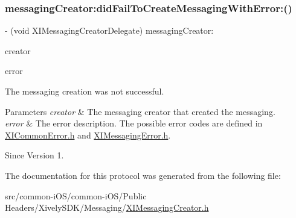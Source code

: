 \subsubsection{\texorpdfstring{messaging\+Creator\+:did\+Fail\+To\+Create\+Messaging\+With\+Error\+:()}{messagingCreator:didFailToCreateMessagingWithError:()}}
{\footnotesize\ttfamily -\/ (void X\+I\+Messaging\+Creator\+Delegate) messaging\+Creator\+: \begin{DoxyParamCaption}\item[{(id$<$ X\+I\+Messaging\+Creator $>$)}]{creator }\item[{didFailToCreateMessagingWithError:(N\+S\+Error $\ast$)}]{error }\end{DoxyParamCaption}}



The messaging creation was not successful. 


\begin{DoxyParams}{Parameters}
{\em creator} & The messaging creator that created the messaging. \\
\hline
{\em error} & The error description. The possible error codes are defined in \hyperlink{_x_i_common_error_8h}{X\+I\+Common\+Error.\+h} and \hyperlink{_x_i_messaging_error_8h}{X\+I\+Messaging\+Error.\+h}. \\
\hline
\end{DoxyParams}
\begin{DoxySince}{Since}
Version 1. 
\end{DoxySince}


The documentation for this protocol was generated from the following file\+:\begin{DoxyCompactItemize}
\item 
src/common-\/i\+O\+S/common-\/i\+O\+S/\+Public Headers/\+Xively\+S\+D\+K/\+Messaging/\hyperlink{_x_i_messaging_creator_8h}{X\+I\+Messaging\+Creator.\+h}\end{DoxyCompactItemize}
